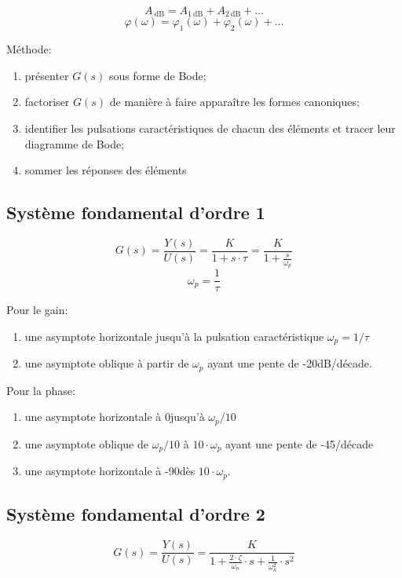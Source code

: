 \documentclass[10pt, twocolumn]{article}
\begin{document}
			\[A_{\mathrm{~dB}}=A_{1 \mathrm{~dB}}+A_{2 \mathrm{~dB}}+\ldots\]
			\[\varphi(\omega)=\varphi_{1}(\omega)+\varphi_{2}(\omega)+\ldots\]
			
			Méthode:
			
			\begin{enumerate}
				\item présenter $G(s)$ sous forme de Bode;
				\item factoriser $G(s)$ de manière à faire apparaître les formes canoniques;
				\item identifier les pulsations caractéristiques de chacun des éléments et tracer leur diagramme de Bode;
				\item sommer les réponses des éléments
			\end{enumerate}
		
		\subsection{Système fondamental d'ordre 1}
		
			\[G(s)=\frac{Y(s)}{U(s)}=\frac{K}{1+s \cdot \tau}=\frac{K}{1+\frac{s}{\omega_{p}}}\]
			\[\omega_{p}=\frac{1}{\tau}\]
			
			Pour le gain:
			
			\begin{enumerate}
				\item une asymptote horizontale jusqu'à la pulsation caractéristique $\omega_p = 1/\tau$
				\item une asymptote oblique à partir de $\omega_p$ ayant une pente de -20dB/décade.
			\end{enumerate}
			
			Pour la phase:
			
			\begin{enumerate}
				\item une asymptote horizontale à 0\textdegree jusqu'à $\omega_p/10$
				\item une asymptote oblique de $\omega_p/10$ à $10\cdot \omega_p$ ayant une pente de -45\textdegree/décade
				\item une asymptote horizontale à -90\textdegree dès $10\cdot \omega_p$.
			\end{enumerate}
		
		\subsection{Système fondamental d'ordre 2}
		
			\[G(s)=\frac{Y(s)}{U(s)}=\frac{K}{1+\frac{2 \cdot \zeta}{\omega_{n}} \cdot s+\frac{1}{\omega_{n}^{2}} \cdot s^{2}}\]
			
\end{document}
